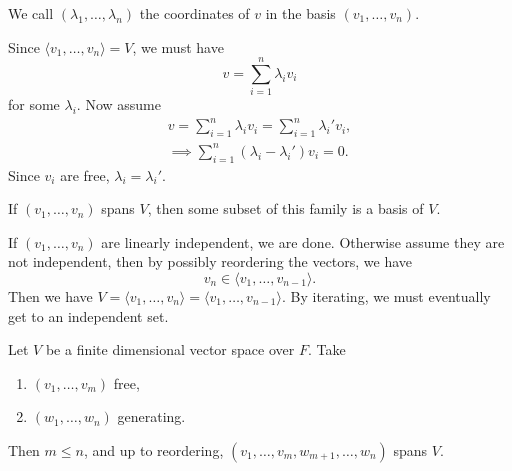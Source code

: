 \documentclass[12pt]{article}
\begin{document}
\begin{remark}
	We call $(\lambda_1, \ldots, \lambda_n)$ the coordinates of $v$ in the basis $(v_1, \ldots, v_n)$.
\end{remark}

\begin{proofbox}
	Since $\langle v_1, \ldots, v_n \rangle = V$, we must have 
	\[
	v = \sum_{i = 1}^{n} \lambda_i v_i
	\]
	for some $\lambda_i$. Now assume
	\begin{align*}
		v = \sum_{i = 1}^{n}\lambda_i v_i = \sum_{i = 1}^{n}\lambda_i' v_i, \\
		\implies \sum_{i = 1}^{n}(\lambda_i - \lambda_i') v_i = 0.
	\end{align*}
	Since $v_i$ are free, $\lambda_i = \lambda_i'$.
\end{proofbox}

\begin{lemma}
	If $(v_1, \ldots, v_n)$ spans $V$, then some subset of this family is a basis of $V$.
\end{lemma}

\begin{proofbox}
	If $(v_1, \ldots, v_n)$ are linearly independent, we are done. Otherwise assume they are not independent, then by possibly reordering the vectors, we have
	\[
		v_n \in \langle v_1, \ldots, v_{n-1}\rangle
	.\]
	Then we have $V = \langle v_1, \ldots, v_n \rangle = \langle v_1, \ldots, v_{n-1}\rangle$.
	By iterating, we must eventually get to an independent set.
\end{proofbox}

\begin{theorem}
	Let $V$ be a finite dimensional vector space over $F$. Take
	\begin{enumerate}[\normalfont(i)]
		\item $(v_1, \ldots, v_m)$ free,
		\item $(w_1, \ldots, w_n)$ generating.
	\end{enumerate}
	Then $m \leq n$, and up to reordering, $(v_1, \ldots, v_m, w_{m+1}, \ldots, w_n)$ spans $V$.
\end{theorem}
\end{document}

